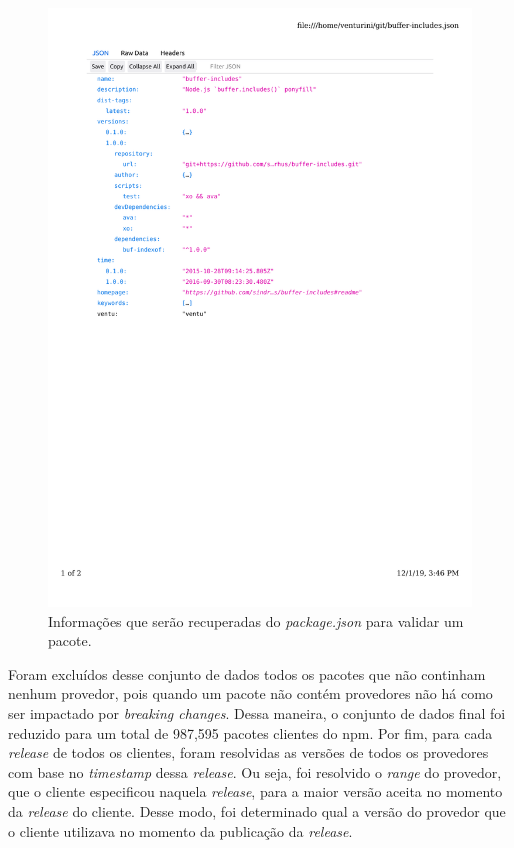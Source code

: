 \begin{figure}
    \centering
    \includegraphics[scale=0.65]{figuras/package_json.pdf}
    \caption{Informações que serão recuperadas do \textit{package.json} para validar um pacote.}
    \label{fig:package_json}
\end{figure}{}

Foram excluídos desse conjunto de dados todos os pacotes que não continham nenhum provedor, pois quando um pacote não contém provedores não há como ser impactado por \textit{breaking changes}. Dessa maneira, o conjunto de dados final foi reduzido para um total de 987,595 pacotes clientes do \textsf{npm}. Por fim, para cada \textit{release} de todos os clientes, foram resolvidas as versões de todos os provedores com base no \textit{timestamp} dessa \textit{release}. Ou seja, foi resolvido o \textit{range} do provedor, que o cliente especificou naquela \textit{release}, para a maior versão aceita no momento da \textit{release} do cliente. Desse modo, foi determinado qual a versão do provedor que o cliente utilizava no momento da publicação da \textit{release}.

